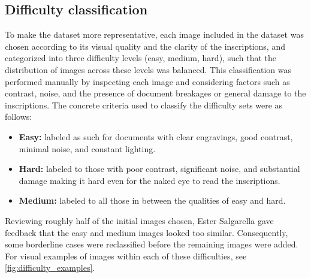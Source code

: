 \subsection{Difficulty classification}
\label{sec:difficulty_classification}
To make the dataset more representative, each image included in the dataset was chosen according to its visual quality and the clarity of the inscriptions, and categorized into three difficulty levels (easy, medium, hard), such that the distribution of images across these levels was balanced.
This classification was performed manually by inspecting each image and considering factors such as contrast, noise, and the presence of document breakages or general damage to the inscriptions.
The concrete criteria used to classify the difficulty sets were as follows:
\begin{itemize}
    \item \textbf{Easy:} labeled as such for documents with clear engravings, good contrast, minimal noise, and constant lighting.
    \item \textbf{Hard:} labeled to those with poor contrast, significant noise, and substantial damage making it hard even for the naked eye to read the inscriptions.
    \item \textbf{Medium:} labeled to all those in between the qualities of easy and hard.
\end{itemize}
Reviewing roughly half of the initial images chosen, Ester Salgarella gave feedback that the easy and medium images looked too similar.
Consequently, some borderline cases were reclassified before the remaining images were added.
For visual examples of images within each of these difficulties, see \cref{fig:difficulty_examples}.


